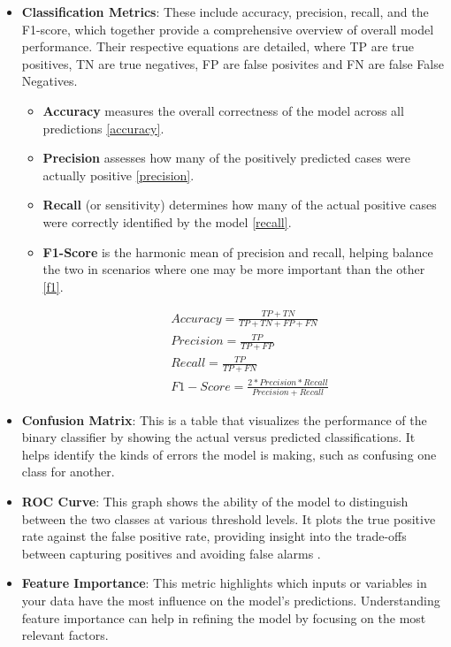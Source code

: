 \begin{itemize}
    \item \textbf{Classification Metrics}: These include accuracy, precision, recall, and the F1-score, which together provide a comprehensive overview of overall model performance. Their respective equations are detailed, where TP are true positives, TN are true negatives, FP are false posivites and FN are false False Negatives.
    \begin{itemize}
        \item \textbf{Accuracy} measures the overall correctness of the model across all predictions \ref{accuracy}. 
        \item \textbf{Precision} assesses how many of the positively predicted cases were actually positive \ref{precision}.
        \item \textbf{Recall} (or sensitivity) determines how many of the actual positive cases were correctly identified by the model \ref{recall}.
        \item \textbf{F1-Score} is the harmonic mean of precision and recall, helping balance the two in scenarios where one may be more important than the other \ref{f1}.
        
        \begin{align} 
            &\mathit{Accuracy} = \frac{TP+TN}{TP+TN+FP+FN} \label{accuracy}\\
            &\mathit{Precision} = \frac{TP}{TP+FP} \label{precision}\\
            &\mathit{Recall} = \frac{TP}{TP+FN} \label{recall}\\
            &F1-Score = \frac{2*\mathit{Precision}*\mathit{Recall}}{\mathit{Precision}+\mathit{Recall} \label{f1}}
        \end{align}
    \end{itemize}
    \item \textbf{Confusion Matrix}: This is a table that visualizes the performance of the binary classifier by showing the actual versus predicted classifications. It helps identify the kinds of errors the model is making, such as confusing one class for another.
    \item \textbf{ROC Curve}: This graph shows the ability of the model to distinguish between the two classes at various threshold levels. It plots the true positive rate against the false positive rate, providing insight into the trade-offs between capturing positives and avoiding false alarms \cite{hoo2017roc}.
    \item \textbf{Feature Importance}: This metric highlights which inputs or variables in your data have the most influence on the model’s predictions. Understanding feature importance can help in refining the model by focusing on the most relevant factors.
\end{itemize}

